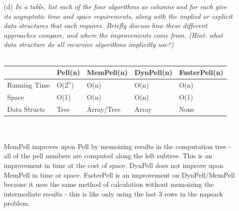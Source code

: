 \documentclass[11pt]{article} \setlength{\oddsidemargin}{0in}
\begin{document}
{\begin{enumerate}
\begin{verbatim}
FasterPell(n) :
  a = 0, b = 1
  for i = 2 to n
    c = 2 * a + b
    a = b
    b = c
  end
  return a
\end{verbatim}

    Ron giggles and says that Hermione has a bug in her
    algorithm. Determine the error, give its correction, and then
    determine the time and space usage of
    \texttt{FasterPell(n)}. Justify your claims.
    \\\\
    \textbf{error:} c = 2 * a + b \\
    \textbf{correction:} c = 2 * b + a \\
    \textbf{T(n)}= O(n) - this is a simple loop doing three O(1) operations n-2 times \\
    \textbf{S(n)}= O(1) - only three numbers are stored at any given time.  
  \pagebreak
  \item[(d)] \textit{In a table, list each of the four algorithms as
      columns and for each give its asymptotic time and space
      requirements, along with the implied or explicit data structures
      that each requires. Briefly discuss how these different
      approaches compare, and where the improvements come from. (Hint:
      what data structure do all recursive algorithms implicitly
      use?)}
    \\\\
    \begin{tabular}{ |p{3cm}||p{2cm}|p{2cm}|p{2cm}|p{2cm} }
     \hline
      & Pell(n) & MemPell(n) & DynPell(n) & FasterPell(n)\\
     \hline
     \hline
     Running Time   & O($2^n$)    & O(n)&  O(n) & O(n)\\
     \hline
     Space &   O(1)  & O(n) & O(n)  & O(1)\\
     \hline
     Data Structs& Tree & Array/Tree& Array & None \\
     \hline
    \end{tabular}
    \\\\
    MemPell improves upon Pell by memoizing results in the computation tree - all of the pell numbers are computed along the left subtree. This is an improvement in time at the cost of space. DynPell does not improve upon MemPell in time or space. FasterPell is an improvement on DynPell/MemPell because it uses the same method of calculation without memoizing the intermediate results - this is like only using the last 3 rows in the napsack problem. 


\end{enumerate}}
\end{document}
